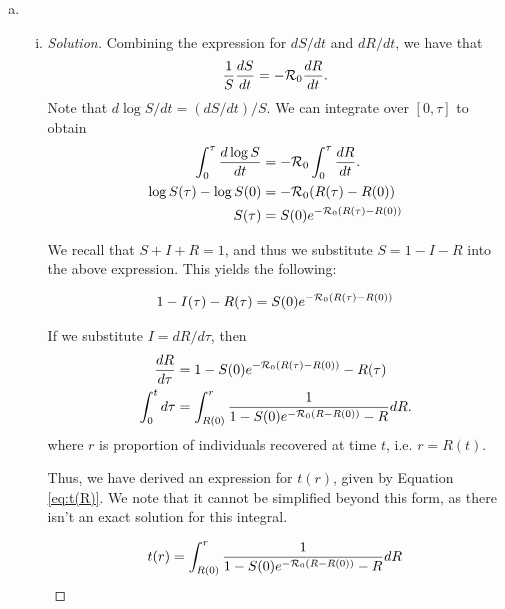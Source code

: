 \documentclass[12pt]{article}
\begin{document}
\begin{enumerate}[(a)]
\item \basicSIRanalQb
  \begin{enumerate}[(i)]
  \item \basicSIRanalQbi

{\color{blue}
\begin{proof}[Solution]
Combining the expression for $dS/dt$ and $dR/dt$, we have that
\begin{equation*}
\frac{1}{S} \frac{dS}{dt} = - {\cal R}_0 \frac{dR}{dt}.
\end{equation*}
Note that $d \log S/dt = (dS/dt)/S$. We can integrate over $[0, \tau]$ to obtain
\begin{equation}\label{eq:S(R)}
\begin{aligned} 
\int_0^\tau \frac{d\log S}{dt} &= - {\cal R}_0 \int_0^\tau \frac{dR}{dt}.\\
\log S(\tau) - \log S(0) &= - {\cal R}_0(R(\tau) -R(0)) \\
S(\tau) &= S(0) e^{-{\cal R}_0(R(\tau)-R(0))}
\end{aligned}
\end{equation}

We recall that $S+I+R=1$, and thus we substitute $S=1-I-R$ into the above expression. This yields the following:

\begin{equation*}
\begin{aligned}
1-I(\tau)-R(\tau)&=S(0)e^{-{\cal R}_0(R(\tau)-R(0))}\\
\end{aligned}
\end{equation*}

If we substitute $I = dR/d\tau$, then 
\begin{equation*}
\begin{aligned}
\frac{dR}{d\tau}&=1-S(0)e^{-{\cal R}_0(R(\tau)-R(0))}-R(\tau) \\
\int_0^t d\tau&=\int_{R(0)}^{r} \frac{1}{1-S(0)e^{-{\cal R}_0(R-R(0))}-R} dR.
\end{aligned}
\end{equation*}
where $r$ is proportion of individuals recovered at time $t$, i.e. $r= R(t)$.


Thus, we have derived an expression for $t(r)$, given by Equation \eqref{eq:t(R)}. We note that it cannot be simplified beyond this form, as there isn't an exact solution for this integral.

\begin{equation}
\label{eq:t(R)}
t(r)=\int_{R(0)}^{r} \frac{1}{1-S(0)e^{-{\cal R}_0(R-R(0))}-R} dR
\end{equation}
\end{proof}
}


\end{enumerate}
\end{enumerate}
\end{document}
